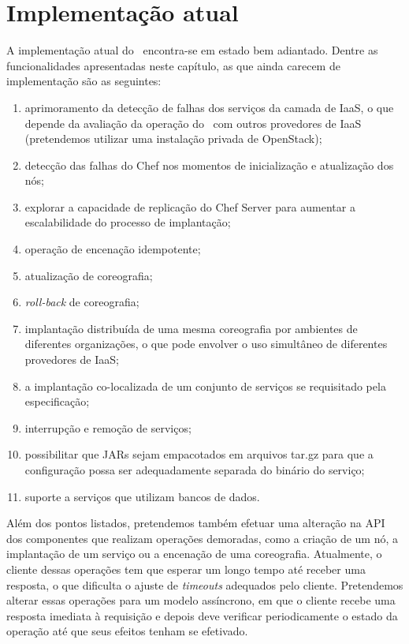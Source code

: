 \section{Implementação atual}
\label{sec:impl_atual}

A implementação atual do \ee\ encontra-se em estado bem adiantado. Dentre as funcionalidades apresentadas neste capítulo, as que ainda carecem de implementação são as seguintes:

\begin{enumerate}
\item aprimoramento da detecção de falhas dos serviços da camada de IaaS, o que depende da avaliação da operação do \ee\ com outros provedores de IaaS (pretendemos utilizar uma instalação privada de OpenStack); 
\item detecção das falhas do Chef nos momentos de inicialização e atualização dos nós;
\item explorar a capacidade de replicação do Chef Server para aumentar a escalabilidade do processo de implantação;
\item operação de encenação idempotente;
\item atualização de coreografia;
\item \textit{roll-back} de coreografia;
\item implantação distribuída de uma mesma coreografia por ambientes de diferentes organizações, o que pode envolver o uso simultâneo de diferentes provedores de IaaS;
\item a implantação co-localizada de um conjunto de serviços se requisitado pela especificação;
\item interrupção e remoção de serviços;
\item possibilitar que JARs sejam empacotados em arquivos tar.gz para que a configuração possa ser adequadamente separada do binário do serviço;
\item suporte a serviços que utilizam bancos de dados.
\end{enumerate}

Além dos pontos listados, pretendemos também efetuar uma alteração na API dos componentes que realizam operações demoradas, como a criação de um nó, a implantação de um serviço ou a encenação de uma coreografia. Atualmente, o cliente dessas operações tem que esperar um longo tempo até receber uma resposta, o que dificulta o ajuste de \textit{timeouts} adequados pelo cliente. Pretendemos alterar essas operações para um modelo assíncrono, em que o cliente recebe uma resposta imediata à requisição e depois deve verificar periodicamente o estado da operação até que seus efeitos tenham se efetivado.

